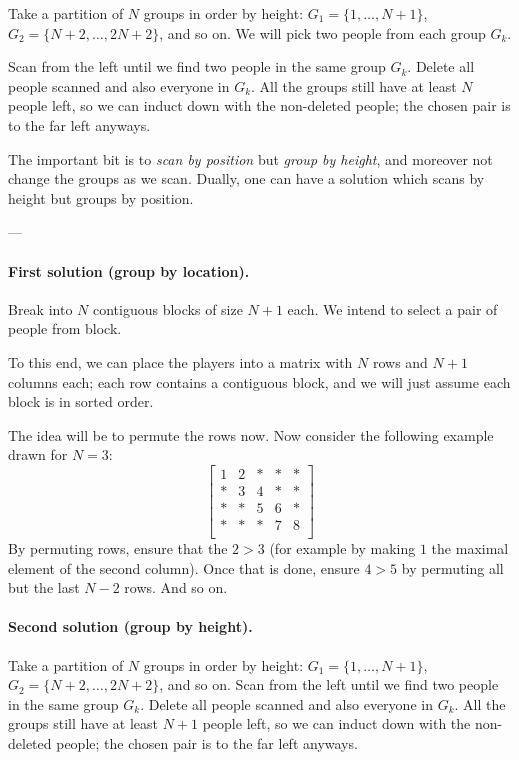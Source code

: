 Take a partition of $N$ groups in order by height:
$G_1 = \{1,\dots,N+1\}$, $G_2 = \{N+2, \dots, 2N+2\}$, and so on.
We will pick two people from each group $G_k$.

Scan from the left until we find two people in the same group $G_k$.
Delete all people scanned and also everyone in $G_k$.
All the groups still have at least $N$ people left,
so we can induct down with the non-deleted people;
the chosen pair is to the far left anyways.

\begin{remark*}
  The important bit is to \emph{scan by position}
  but \emph{group by height},
  and moreover not change the groups as we scan.
  Dually, one can have a solution which scans by height
  but groups by position.
\end{remark*}


---

\paragraph{First solution (group by location).}
Break into $N$ contiguous blocks of size $N+1$ each.
We intend to select a pair of people from block.

To this end, we can place the players into a matrix
with $N$ rows and $N+1$ columns each;
each row contains a contiguous block,
and we will just assume each block is in sorted order.

The idea will be to permute the rows now.
Now consider the following example drawn for $N = 3$:
\[
  \begin{bmatrix}
    1 & 2 & \ast & \ast & \ast \\
    \ast & 3 & 4 & \ast & \ast \\
    \ast & \ast & 5 & 6 & \ast  \\
    \ast & \ast & \ast & 7 & 8  \\
  \end{bmatrix}
\]
By permuting rows, ensure that the $2 > 3$
(for example by making $1$ the maximal element of the second column).
Once that is done, ensure $4 > 5$ by permuting
all but the last $N-2$ rows.
And so on.

\paragraph{Second solution (group by height).}
Take a partition of $N$ groups in order by height:
$G_1 = \{1,\dots,N+1\}$, $G_2 = \{N+2, \dots, 2N+2\}$, and so on.
Scan from the left until we find two people in the same group $G_k$.
Delete all people scanned and also everyone in $G_k$.
All the groups still have at least $N+1$ people left,
so we can induct down with the non-deleted people;
the chosen pair is to the far left anyways.
